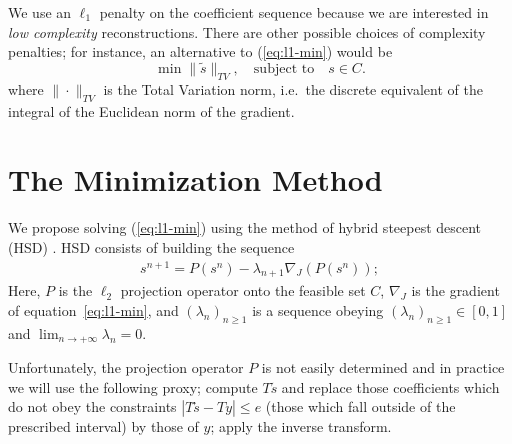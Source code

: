 We use an $\ell_1$ penalty on the coefficient sequence because we are
interested in {\em low complexity} reconstructions. There are other
possible choices of complexity penalties; for instance, an alternative
to (\ref{eq:l1-min}) would be
\[
\label{eq:tv-min}
  \min \|\tilde{s}\|_{TV}, \quad \mbox{subject to} \quad s \in C. 
\]
where $\|\cdot\|_{TV}$ is the Total Variation norm, i.e.\ the discrete
equivalent of the integral of the Euclidean norm of the gradient.

\section{The Minimization Method}

We propose solving (\ref{eq:l1-min}) using the method of hybrid
steepest descent (HSD) \cite{wave:yamada01}. HSD consists of building
the sequence
\begin{eqnarray}
 s^{n+1} = P(s^{n}) - \lambda_{n+1} \nabla_J(P(s^{n})); 
\end{eqnarray}
Here, $P$ is the $\ell_2$ projection operator onto the feasible set
$C$, $\nabla_J$ is the gradient of equation~\ref{eq:l1-min}, and
$(\lambda_{n})_{n \ge 1}$ is a sequence obeying $(\lambda_{n})_{n\ge
  1} \in [0,1] $ and $\lim_{ n \rightarrow + \infty } \lambda_{n} = 0$.

Unfortunately, the projection operator $P$ is not easily determined
and in practice we will use the following proxy; compute $T \tilde{s}$
and replace those coefficients which do not obey the constraints $|T
\tilde{s} - Ty| \le e$ (those which fall outside of the prescribed
interval) by those of $y$; apply the inverse transform.  

